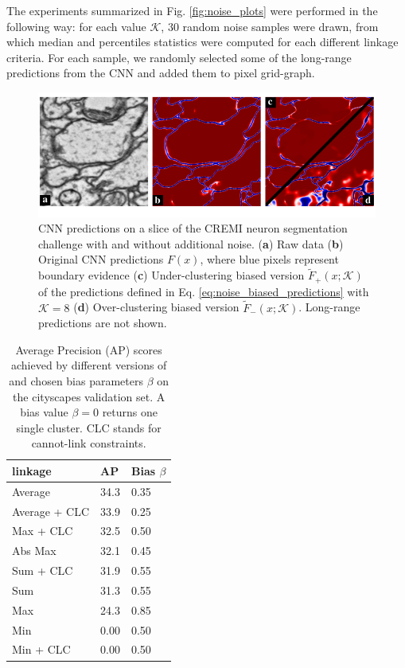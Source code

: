 The experiments summarized in Fig. \ref{fig:noise_plots} were performed in the following way: for each value $\mathcal{K}$, 30 random noise samples were drawn, from which median and percentiles statistics were computed for each different linkage criteria. For each sample, we randomly selected some of the long-range predictions from the CNN and added them to pixel grid-graph.
\begin{figure}[t]
\centering
        \includegraphics[width=\textwidth,trim=0.0in -0.in -0.0in -0.4in,clip]{figs/noisy_affs_comparison.pdf}
    \caption{CNN predictions on a slice of the CREMI neuron segmentation challenge with and without additional noise. (\textbf{a}) Raw data (\textbf{b}) Original CNN predictions $F(x)$, where blue pixels represent boundary evidence (\textbf{c}) Under-clustering biased version $\tilde{F}_{+}(x;\mathcal{K})$ of the predictions defined in Eq. \ref{eq:noise_biased_predictions} with $\mathcal{K}=8$ (\textbf{d}) Over-clustering biased version $\tilde{F}_{-}(x;\mathcal{K})$. Long-range predictions are not shown.
    }
    \label{fig:noisy_affs}
\end{figure}
\begin{table}
    \centering
    \vspace*{0.6em}
        \begin{tabular}{l M{7em} M{7em}}
          \algname{} linkage & AP  & Bias $\beta$ \\ \midrule
          Average & 34.3 & 0.35 \\
          Average + CLC & 33.9 & 0.25\\
          Max + CLC & 32.5 & 0.50 \\
          Abs Max & 32.1 & 0.45\\
          Sum + CLC & 31.9 & 0.55 \\
          Sum & 31.3 & 0.55 \\
          Max & 24.3 & 0.85 \\
          Min & 0.00 & 0.50 \\
          Min + CLC & 0.00 & 0.50 \\
        \end{tabular}
    \vspace*{2em}
    \caption{Average Precision (AP) scores achieved by different versions of \algname{} and chosen bias parameters $\beta$ on the cityscapes validation set. A bias value $\beta=0$ returns one single cluster. CLC stands for cannot-link constraints.}
    \label{tab:extended_results_cityscapes_val}
\end{table}




